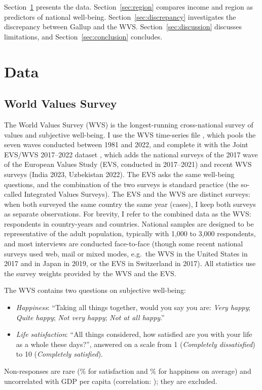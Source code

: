 \documentclass[12pt]{article}
\begin{document}
Section~\ref{sec:data} presents the data. Section~\ref{sec:region} compares income and region as predictors of national well-being. Section~\ref{sec:discrepancy} investigates the discrepancy between Gallup and the WVS. Section~\ref{sec:discussion} discusses limitations, and Section~\ref{sec:conclusion} concludes.

\section{Data}\label{sec:data}
\subsection{World Values Survey}\label{subsec:wvs}

The World Values Survey (WVS) is the longest-running cross-national survey of values and subjective well-being. I use the WVS time-series file \citep{wvs_trend_2022}, which pools the seven waves conducted between 1981 and 2022, and complete it with the Joint EVS/WVS 2017--2022 dataset \citep{evs_wvs_joint_2024}, which adds the \nEVSSurveys national surveys of the 2017 wave of the European Values Study (EVS, conducted in 2017--2021) and \nNewWVSSurveys recent WVS surveys (India 2023, Uzbekistan 2022). The EVS asks the same well-being questions, and the combination of the two surveys is standard practice (the so-called Integrated Values Surveys). The EVS and the WVS are distinct surveys: when both surveyed the same country the same year (\nEVSSameYearWVS cases), I keep both surveys as separate observations.
For brevity, I refer to the combined data as the WVS: \nWVSRespondents respondents in \nWVSCountryYears country-years and \nWVSCountries countries. National samples are designed to be representative of the adult population, typically with 1,000 to 3,000 respondents, and most interviews are conducted face-to-face (though some recent national surveys used web, mail or mixed modes, e.g.\ the WVS in the United States in 2017 and in Japan in 2019, or the EVS in Switzerland in 2017). All statistics use the survey weights provided by the WVS and the EVS.

The WVS contains two questions on subjective well-being:
\begin{itemize}
    \item \textit{Happiness}: ``Taking all things together, would you say you are: \textit{Very happy}; \textit{Quite happy}; \textit{Not very happy}; \textit{Not at all happy}.''
    \item \textit{Life satisfaction}: ``All things considered, how satisfied are you with your life as a whole these days?'', answered on a scale from 1 (\textit{Completely dissatisfied}) to 10 (\textit{Completely satisfied}).
\end{itemize}
Non-responses are rare (\nonresponseSatisfactionWVS\% for satisfaction and \nonresponseHappinessWVS\% for happiness on average) and uncorrelated with GDP per capita (correlation: \corNonresponseGDP); they are excluded.
\end{document}
